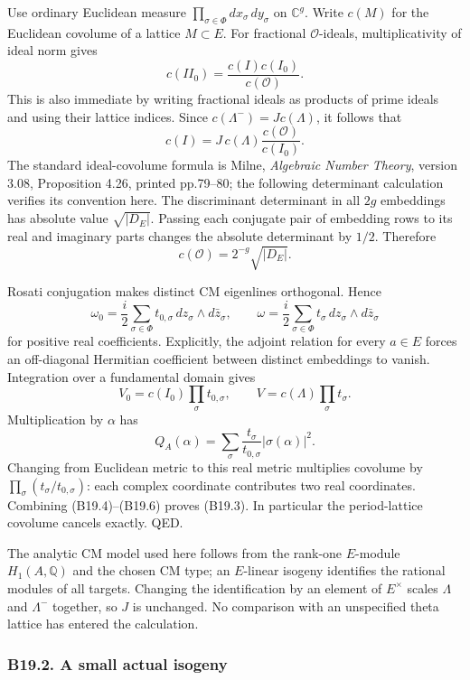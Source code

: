 \documentclass[11pt,a4paper]{article}
\theoremstyle{definition}
\begin{document}
Use ordinary Euclidean measure \(\prod_{\sigma\in\Phi}dx_\sigma\,dy_\sigma\) on \(\mathbb C^g\). Write \(c(M)\) for the Euclidean covolume of a lattice \(M\subset E\). For fractional \(\mathcal O\)-ideals, multiplicativity of ideal norm gives \[
 c(I I_0)=\frac{c(I)c(I_0)}{c(\mathcal O)}.
\] This is also immediate by writing fractional ideals as products of prime ideals and using their lattice indices. Since \(c(\Lambda^-)=Jc(\Lambda)\), it follows that \[
 c(I)=J\,c(\Lambda)\frac{c(\mathcal O)}{c(I_0)}.
\tag{B19.4}
\] The standard ideal-covolume formula is Milne, \emph{Algebraic Number Theory}, version 3.08, Proposition 4.26, printed pp.79--80; the following determinant calculation verifies its convention here. The discriminant determinant in all \(2g\) embeddings has absolute value \(\sqrt{|D_E|}\). Passing each conjugate pair of embedding rows to its real and imaginary parts changes the absolute determinant by \(1/2\). Therefore \[
 c(\mathcal O)=2^{-g}\sqrt{|D_E|}.
\tag{B19.5}
\]

Rosati conjugation makes distinct CM eigenlines orthogonal. Hence \[
 \omega_0=\frac i2\sum_{\sigma\in\Phi}t_{0,\sigma}\,dz_\sigma\wedge d\bar z_\sigma,
 \qquad
 \omega=\frac i2\sum_{\sigma\in\Phi}t_\sigma\,dz_\sigma\wedge d\bar z_\sigma
\] for positive real coefficients. Explicitly, the adjoint relation for every \(a\in E\) forces an off-diagonal Hermitian coefficient between distinct embeddings to vanish. Integration over a fundamental domain gives \[
 V_0=c(I_0)\prod_\sigma t_{0,\sigma},\qquad
 V=c(\Lambda)\prod_\sigma t_\sigma.
\tag{B19.6}
\] Multiplication by \(\alpha\) has \[
 Q_A(\alpha)=\sum_\sigma\frac{t_\sigma}{t_{0,\sigma}}|\sigma(\alpha)|^2.
\] Changing from Euclidean metric to this real metric multiplies covolume by \(\prod_\sigma(t_\sigma/t_{0,\sigma})\): each complex coordinate contributes two real coordinates. Combining (B19.4)--(B19.6) proves (B19.3). In particular the period-lattice covolume cancels exactly. QED.

The analytic CM model used here follows from the rank-one \(E\)-module \(H_1(A,\mathbb Q)\) and the chosen CM type; an \(E\)-linear isogeny identifies the rational modules of all targets. Changing the identification by an element of \(E^\times\) scales \(\Lambda\) and \(\Lambda^-\) together, so \(J\) is unchanged. No comparison with an unspecified theta lattice has entered the calculation.

\subsubsection{B19.2. A small actual isogeny}\label{b19.2.-a-small-actual-isogeny}
\end{document}
